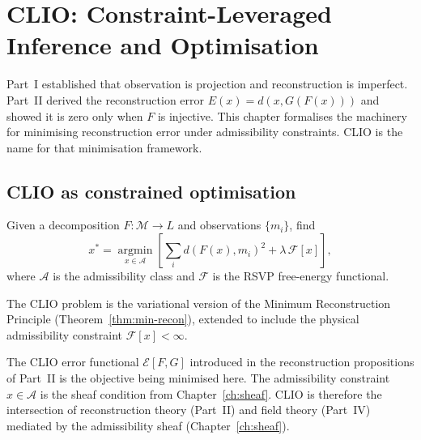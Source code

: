 
\chapter{CLIO: Constraint-Leveraged Inference and Optimisation}
\label{ch:clio}

\begin{WhyChapter}
  Part~I established that observation is projection and
  reconstruction is imperfect.
  Part~II derived the reconstruction error $E(x) = d(x,G(F(x)))$
  and showed it is zero only when $F$ is injective.
  This chapter formalises the machinery for minimising
  reconstruction error under admissibility constraints.
  CLIO is the name for that minimisation framework.
\end{WhyChapter}



\section{CLIO as constrained optimisation}

\begin{definition}
  Given a decomposition $F : \mathcal{M} \to L$ and
  observations $\{m_i\}$, find
  \[
    x^* = \operatorname*{argmin}_{x \in \mathcal{A}}
    \left[\sum_i d(F(x), m_i)^2 + \lambda\,\mathcal{F}[x]\right],
  \]
  where $\mathcal{A}$ is the admissibility class and
  $\mathcal{F}$ is the RSVP free-energy functional.
\end{definition}

The CLIO problem is the variational version of the Minimum
Reconstruction Principle (Theorem~\ref{thm:min-recon}),
extended to include the physical admissibility constraint
$\mathcal{F}[x] < \infty$.

\begin{ChapterConnection}
  The CLIO error functional $\mathcal{E}[F,G]$ introduced
  in the reconstruction propositions of Part~II is the
  objective being minimised here.
  The admissibility constraint $x \in \mathcal{A}$ is the
  sheaf condition from Chapter~\ref{ch:sheaf}.
  CLIO is therefore the intersection of reconstruction theory
  (Part~II) and field theory (Part~IV) mediated by the
  admissibility sheaf (Chapter~\ref{ch:sheaf}).
\end{ChapterConnection}

